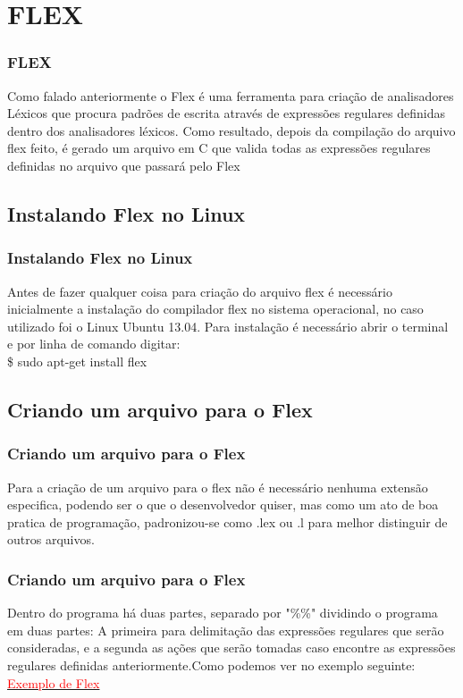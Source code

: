 \documentclass{beamer}
\begin{document}
\section{FLEX}			%
\begin{frame}
\frametitle{FLEX}
  Como falado anteriormente o Flex é uma ferramenta para criação de analisadores Léxicos que
 procura padrões de escrita através de expressões regulares definidas dentro dos analisadores léxicos.
  Como resultado, depois da compilação do arquivo flex feito, é gerado um arquivo em C que valida
 todas as expressões regulares definidas no arquivo que passará pelo Flex
 
\end{frame}

\subsection{Instalando Flex no Linux}
\begin{frame}
\frametitle{Instalando Flex no  Linux}
	Antes de fazer qualquer coisa para criação do arquivo flex é necessário inicialmente a instalação do 
compilador flex no sistema operacional, no caso utilizado foi o Linux Ubuntu 13.04.
	Para instalação é necessário abrir o terminal e por linha de comando digitar: 
			\\ \$ sudo apt-get install flex
\end{frame}



\subsection{Criando um arquivo para o Flex}
\begin{frame}
\frametitle{Criando um arquivo para o Flex}

  Para a criação de um arquivo para o flex não é necessário nenhuma extensão especifica, podendo ser 
 o que o desenvolvedor quiser, mas como um ato de boa pratica de programação, padronizou-se como .lex ou 
 .l para melhor distinguir de outros arquivos.

\end{frame}
\begin{frame}
\frametitle{Criando um arquivo para o Flex}

  Dentro do programa há duas partes, separado por "\%\%" dividindo o programa em duas partes: %
A primeira para delimitação das expressões regulares que serão consideradas, e a segunda as ações que serão
tomadas caso encontre as expressões regulares definidas anteriormente.Como podemos ver no exemplo seguinte:
 \href{https://github.com/Walderi/compz-equipe-01-2013-1/blob/master/ValidaEmailFlex/valida_email.lex}{\textcolor{red}{Exemplo de Flex}}
 
\end{frame}
 
\end{document}

